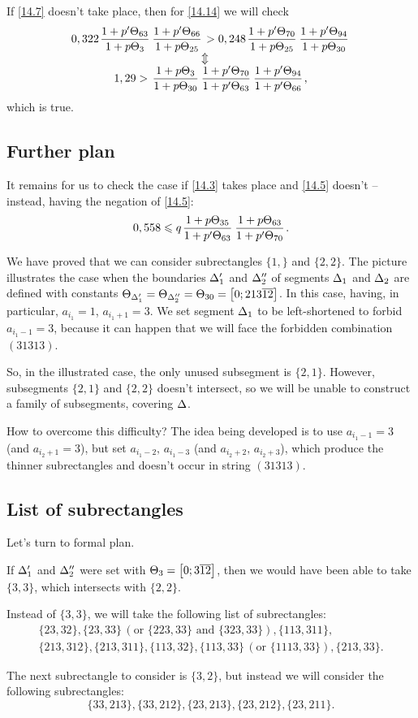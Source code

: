 If \ref{14.7} doesn't take place, then for \ref{14.14} we will check
\begin{gather*}
	0,322 \pu{63}{3} \pu{66}{25} > 0,248 \pu{70}{25} \pu{94}{30}\\
	\ArrowBetweenLines
	1,29 > \uu{3}{30} \pp{70}{63} \pp{94}{66},
\end{gather*}
which is true.

\subsection{Further plan}

It remains for us to check the case if \ref{14.3} takes place and \ref{14.5} doesn't --
instead, having the negation of \ref{14.5}:
\begin{equation}\label{14.15}
	0,558 \leqslant q \up{35}{63} \up{63}{70}.
\end{equation}

We have proved that we can consider subrectangles $\{1,\}$ and $\{2, 2\}$.
The picture illustrates the case when
the boundaries $\Delta_1'$ and $\Delta_2''$ of segments $\Delta_1$ and $\Delta_2$ are defined
with constants $\Theta_{\Delta_1'} = \Theta_{\Delta_2''} = \Theta_{30} = \left[0; 213\overline{12}\right]$.
In this case, having, in particular, $a_{i_1} = 1$, $a_{i_1 + 1} = 3$.
We set segment $\Delta_1$ to be left-shortened to forbid $a_{i_1 - 1} = 3$,
because it can happen that we will face the forbidden combination $(31313)$.

So, in the illustrated case, the only unused subsegment is $\{2, 1\}$.
However, subsegments $\{2, 1\}$ and $\{2, 2\}$ doesn't intersect,
so we will be unable to construct a family of subsegments, covering $\Delta$.

How to overcome this difficulty?
The idea being developed is to use $a_{i_1 - 1} = 3$ (and $a_{i_2 + 1} = 3$),
but set $a_{i_1 - 2},\, a_{i_1 - 3}$ (and $a_{i_2 + 2},\, a_{i_2 + 3}$),
which produce the thinner subrectangles and doesn't occur in string $(31313)$.

\subsection{List of subrectangles}

Let's turn to formal plan.

If $\Delta_1'$ and $\Delta_2''$ were set with $\Theta_{3} = \left[0; 3\overline{12}\right]$,
then we would have been able to take $\{3, 3\}$, which intersects with $\{2, 2\}$.

Instead of $\{3, 3\}$, we will take the following list of subrectangles:
\begin{gather*}
	\{23, 32\}, \{23, 33\} \,(\text{or } \{223, 33\} \text{ and } \{323, 33\}), \{113, 311\},\\
	\{213, 312\}, \{213, 311\}, \{113, 32\}, \{113, 33\} \,(\text{or } \{1113, 33\}), \{213, 33\}.
\end{gather*}

The next subrectangle to consider is $\{3,2\}$, but instead we will consider the following subrectangles:
\begin{equation*}
	\{33, 213\}, \{33, 212\}, \{23, 213\}, \{23, 212\}, \{23, 211\}.
\end{equation*}
